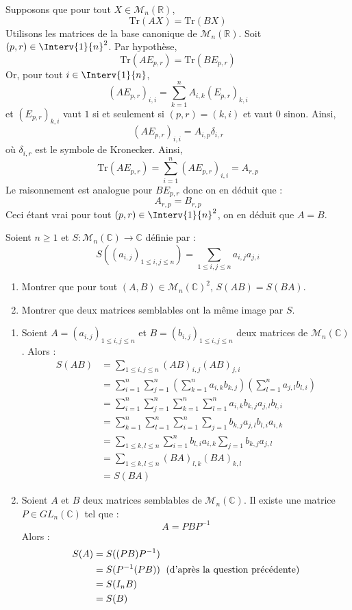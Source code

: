 \documentclass[a4paper,10pt]{report}
\begin{document}
\corr Supposons que pour tout $X \in \mathcal{M}_n(\mathbb{R})$, 
$$\textrm{Tr}(AX)= \textrm{Tr}(BX)$$
Utilisons les matrices de la base canonique de $\mathcal{M}_n(\mathbb{R})$. Soit $(p,r) \in \Interv{1}{n}^2$. Par hypothèse,
$$ \textrm{Tr}(AE_{p,r})= \textrm{Tr}(BE_{p,r})$$
Or, pour tout $i \in \Interv{1}{n}$,
$$ (A E_{p,r})_{i,i} = \sum_{k=1}^n A_{i,k} (E_{p,r})_{k,i} $$
et $(E_{p,r})_{k,i}$ vaut $1$ si et seulement si $(p,r)=(k,i)$ et vaut $0$ sinon. Ainsi,
$$ (A E_{p,r})_{i,i} = A_{i,p} \delta_{i,r}$$
où $\delta_{i,r}$ est le symbole de Kronecker. Ainsi,
 $$ \textrm{Tr}(AE_{p,r}) = \sum_{i=1}^n (A E_{p,r})_{i,i} = A_{r,p}$$
 Le raisonnement est analogue pour $B E_{p,r}$ donc on en déduit que :
 $$ A_{r,p}= B_{r,p}$$
 Ceci étant vrai pour tout $(p,r) \in \Interv{1}{n}^2$, on en déduit que $A=B$.

\begin{Exercice}{} Soient $n \geq 1$ et $S : \mathcal{M}_n(\mathbb{C}) \rightarrow \mathbb{C}$ définie par :
$$ S((a_{i,j})_{1 \leq i,j \leq n}) = \sum_{1 \leq i,j \leq n} a_{i,j} a_{j,i}$$

\begin{enumerate}
\item Montrer que pour tout $(A,B) \in \mathcal{M}_n(\mathbb{C})^2$, $S(AB)=S(BA)$.
\item Montrer que deux matrices semblables ont la même image par $S$.
\end{enumerate}
\end{Exercice}

\corr 

\begin{enumerate}
\item Soient $A=(a_{i,j})_{1 \leq i,j \leq n}$ et $B= (b_{i,j})_{1 \leq i,j \leq n}$  deux matrices de $\mathcal{M}_n(\mathbb{C})$. Alors :
\begin{align*}
S(AB) & =  \sum_{1 \leq i,j \leq n} (AB)_{i,j} (AB)_{j,i} \\
& = \sum_{i=1}^n \sum_{j=1}^n \left( \sum_{k=1}^n a_{i,k} b_{k,j} \right) \left( \sum_{l=1}^n a_{j,l} b_{l,i} \right) \\
& =  \sum_{i=1}^n \sum_{j=1}^n \sum_{k=1}^n \sum_{l=1}^n a_{i,k} b_{k,j} a_{j,l} b_{l,i} \\
& = \sum_{k=1}^n \sum_{l=1}^n \sum_{i=1}^n \sum_{j=1} b_{k,j} a_{j,l} b_{l,i} a_{i,k} \\
& = \sum_{1 \leq k,l \leq n} \sum_{i=1}^n  b_{l,i} a_{i,k}  \sum_{j=1} b_{k,j} a_{j,l} \\
& = \sum_{1 \leq k,l \leq n} (BA)_{l,k} (BA)_{k,l} \\
& = S(BA) 
\end{align*}
\item Soient $A$ et $B$ deux matrices semblables de $\mathcal{M}_n(\mathbb{C})$. Il existe une matrice $P \in GL_n(\mathbb{C})$ tel que :
$$ A=PBP^{-1}$$
Alors :
\begin{align*}
S(A) & = S((PB)P^{-1}) \\
& = S(P^{-1} (PB)) \; \hbox{ (d'après la question précédente)} \\
& = S(I_n B) \\
& = S(B)
\end{align*}
\end{enumerate}
\end{document}
